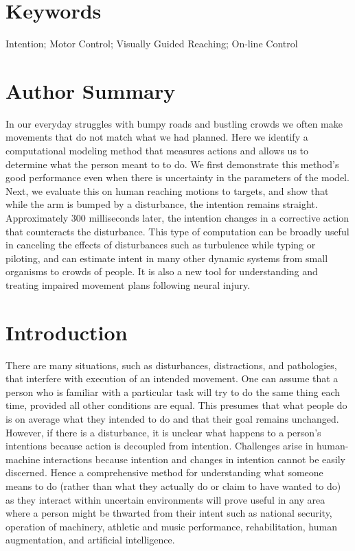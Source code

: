 \documentclass[10pt]{article}
\begin{document}
\section*{Keywords}
Intention; Motor Control; Visually Guided Reaching; On-line Control

\section*{Author Summary}
In our everyday struggles with bumpy roads and bustling crowds we often make movements that do not match what we had planned. Here we identify a computational modeling method that measures actions and allows us to determine what the person meant to to do. We first demonstrate this method's good performance even when there is uncertainty in the parameters of the model. Next, we evaluate this on human reaching motions to targets, and show that while the arm is bumped by a disturbance, the intention remains straight. Approximately 300 milliseconds later, the intention changes in a corrective action that counteracts the disturbance. This type of computation can be broadly useful in canceling the effects of disturbances such as turbulence while typing or piloting, and can estimate intent in many other dynamic systems from small organisms to crowds of people. It is also a new tool for understanding and treating impaired movement plans following neural injury.

\section*{Introduction}
There are many situations, such as disturbances, distractions, and pathologies, that interfere with execution of an intended movement. One can assume that a person who is familiar with a particular task will try to do the same thing each time, provided all other conditions are equal. This presumes that what people do is on average what they intended to do and that their goal remains unchanged. However, if there is a disturbance, it is unclear what happens to a person's intentions because action is decoupled from intention. Challenges arise in human-machine interactions because intention and changes in intention cannot be easily discerned. Hence a comprehensive method for understanding what someone means to do (rather than what they actually do or claim to have wanted to do) as they interact within uncertain environments will prove useful in any area where a person might be thwarted from their intent such as national security, operation of machinery, athletic and music performance, rehabilitation, human augmentation, and artificial intelligence.
\end{document}
